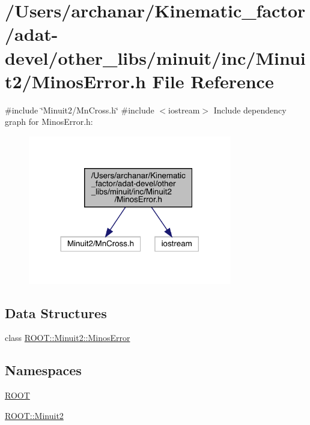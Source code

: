 \hypertarget{adat-devel_2other__libs_2minuit_2inc_2Minuit2_2MinosError_8h}{}\section{/\+Users/archanar/\+Kinematic\+\_\+factor/adat-\/devel/other\+\_\+libs/minuit/inc/\+Minuit2/\+Minos\+Error.h File Reference}
\label{adat-devel_2other__libs_2minuit_2inc_2Minuit2_2MinosError_8h}
{\ttfamily \#include \char`\"{}Minuit2/\+Mn\+Cross.\+h\char`\"{}}\newline
{\ttfamily \#include $<$iostream$>$}\newline
Include dependency graph for Minos\+Error.\+h\+:
\nopagebreak
\begin{figure}[H]
\begin{center}
\leavevmode
\includegraphics[width=252pt]{d6/d3c/adat-devel_2other__libs_2minuit_2inc_2Minuit2_2MinosError_8h__incl}
\end{center}
\end{figure}
\subsection*{Data Structures}
\begin{DoxyCompactItemize}
\item 
class \mbox{\hyperlink{classROOT_1_1Minuit2_1_1MinosError}{R\+O\+O\+T\+::\+Minuit2\+::\+Minos\+Error}}
\end{DoxyCompactItemize}
\subsection*{Namespaces}
\begin{DoxyCompactItemize}
\item 
 \mbox{\hyperlink{namespaceROOT}{R\+O\+OT}}
\item 
 \mbox{\hyperlink{namespaceROOT_1_1Minuit2}{R\+O\+O\+T\+::\+Minuit2}}
\end{DoxyCompactItemize}
